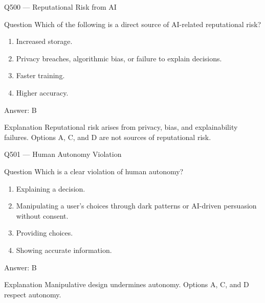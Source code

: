 \documentclass[aspectratio=169,8pt]{beamer}
\begin{document}
	\begin{frame}{Q500 --- Reputational Risk from AI}
		\begin{block}{Question}
			Which of the following is a direct source of AI-related reputational risk?
			\begin{enumerate}
				\item Increased storage.
				\item Privacy breaches, algorithmic bias, or failure to explain decisions.
				\item Faster training.
				\item Higher accuracy.
			\end{enumerate}
		\end{block}
		\begin{exampleblock}{Answer: B}\end{exampleblock}
		\begin{block}{Explanation}
			Reputational risk arises from privacy, bias, and explainability failures. Options A, C, and D are not sources of reputational risk.
		\end{block}
	\end{frame}
	
	\begin{frame}{Q501 --- Human Autonomy Violation}
		\begin{block}{Question}
			Which is a clear violation of human autonomy?
			\begin{enumerate}
				\item Explaining a decision.
				\item Manipulating a user's choices through dark patterns or AI-driven persuasion without consent.
				\item Providing choices.
				\item Showing accurate information.
			\end{enumerate}
		\end{block}
		\begin{exampleblock}{Answer: B}\end{exampleblock}
		\begin{block}{Explanation}
			Manipulative design undermines autonomy. Options A, C, and D respect autonomy.
		\end{block}
	\end{frame}
	
\end{document}
